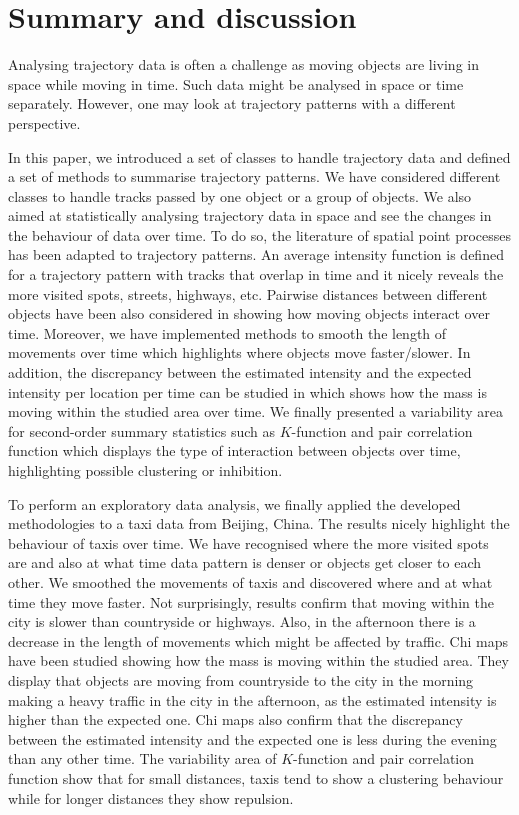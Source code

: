\documentclass[article]{jss}
\begin{document}
 \section{Summary and discussion} \label{sec:summary}
  Analysing trajectory data is often a challenge as moving objects are living in space while moving in time. Such data might be analysed in space or time separately. However, one may look at trajectory patterns with a different perspective. 
  
  In this paper, we introduced a set of classes to handle trajectory data and defined a set of methods to summarise trajectory patterns. We have considered different classes to handle tracks passed by one object or a group of objects. We also aimed at statistically analysing trajectory data in space and see the changes in the behaviour of data over time. To do so, the literature of spatial point processes has been adapted to trajectory patterns. An average intensity function is defined for a trajectory pattern with tracks that overlap in time and it nicely reveals the more visited spots, streets, highways, etc. Pairwise distances between different objects have been also considered in  showing how moving objects interact over time. Moreover, we have implemented methods to smooth the length of movements over time which highlights where objects move faster/slower. In addition, the discrepancy between the estimated intensity and the expected intensity per location per time can be studied in  which shows how the mass is moving within the studied area over time. We finally presented a variability area for second-order summary statistics such as $K$-function and pair correlation function which displays the type of interaction between objects over time, highlighting possible clustering or inhibition.
  
  To perform an exploratory data analysis, we finally applied the developed methodologies to a taxi data from Beijing, China. The results nicely highlight the behaviour of taxis over time. We have recognised where the more visited spots are and also at what time data pattern is denser or objects get closer to each other. We smoothed the movements of taxis and discovered where and at what time they move faster. Not surprisingly, results confirm that moving within the city is slower than countryside or highways. Also, in the afternoon there is a decrease in the length of movements which might be affected by traffic. Chi maps have been studied showing how the mass is moving within the studied area. They display that objects are moving from countryside to the city in the morning making a heavy traffic in the city in the afternoon, as the estimated intensity is higher than the expected one. Chi maps also confirm that the  discrepancy between the estimated intensity and the expected one is less during the evening than any other time. The variability area of $K$-function and pair correlation function show that for small distances, taxis tend to show a clustering behaviour while for longer distances they show repulsion.
  
\end{document}
